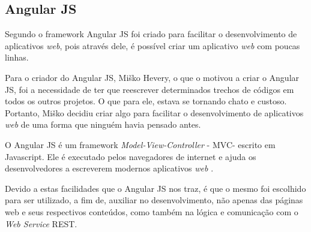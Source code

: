 \subsection{Angular JS}

Segundo  o framework Angular JS foi criado para facilitar o desenvolvimento de aplicativos \textit{web}, pois através dele, é possível criar um aplicativo \textit{web} com poucas linhas.

Para o criador do Angular JS, Miško Hevery, o que o motivou a criar o Angular JS, foi a necessidade de ter que reescrever determinados trechos de códigos em todos os outros projetos. O que para ele, estava se tornando chato e custoso. Portanto, Miško decidiu criar algo para facilitar o desenvolvimento de aplicativos \textit{web} de uma forma que ninguém havia pensado antes.

O Angular JS é um framework \textit{Model-View-Controller} - MVC\footnotemark[30] - escrito em Javascript. Ele é executado pelos navegadores de internet e ajuda os desenvolvedores a escreverem modernos aplicativos \textit{web} \cite{kozlowski_darwin_mastering_web_application_angular_js}.


Devido a estas facilidades que o Angular JS nos traz, é que o mesmo foi escolhido para ser utilizado, a fim de, auxiliar no desenvolvimento, não apenas das páginas web e seus respectivos conteúdos, como também na lógica e comunicação com o \textit{Web Service} REST.
